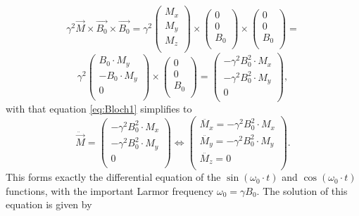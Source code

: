 \documentclass[a4paper,12pt]{extarticle}
\begin{document}
 \begin{equation*}
 \gamma^2\vec{M}\times\vec{B_0}\times\vec{B_0}  = \gamma^2
  \begin{pmatrix}
 M_x \\
 M_y  \\
 M_z \\
\end{pmatrix} \times
 \begin{pmatrix}
 0 \\
 0  \\
 B_0 \\
\end{pmatrix} \times
 \begin{pmatrix}
0 \\
0  \\
B_0 \\
\end{pmatrix}
=
\end{equation*}\begin{equation*}
 \gamma^2
 \begin{pmatrix}
B_0\cdot M_y \\
-B_0\cdot M_y   \\
 0 \\
\end{pmatrix}
\times
\begin{pmatrix}
 0 \\
 0  \\
 B_0 \\
\end{pmatrix} =
 \begin{pmatrix}
-\gamma^2B_0^2\cdot M_x \\
 -\gamma^2B_0^2\cdot M_y   \\
 0 \\
\end{pmatrix},
 \end{equation*}
 with that equation \eqref{eq:Bloch1} simplifies to
 \begin{equation}
 \ddot{\vec{M}}=
 \begin{pmatrix}
-\gamma^2B_0^2\cdot M_x \\
 -\gamma^2B_0^2\cdot M_y   \\
 0 \\
\end{pmatrix} \Leftrightarrow
\begin{pmatrix}
\ddot{M_x}  = -\gamma^2B_0^2\cdot M_x \\
 \ddot{M_y}  = -\gamma^2B_0^2\cdot M_y   \\
 \ddot{M_z}  = 0 \\
\end{pmatrix}.
\end{equation}This forms exactly the differential equation of the $ \sin{(\omega_0\cdot t)}$ and $ \cos{(\omega_0\cdot t)}$  functions, with the important Larmor frequency $ \omega_0 = \gamma B_0$. The solution of this equation is given by
\end{document}
